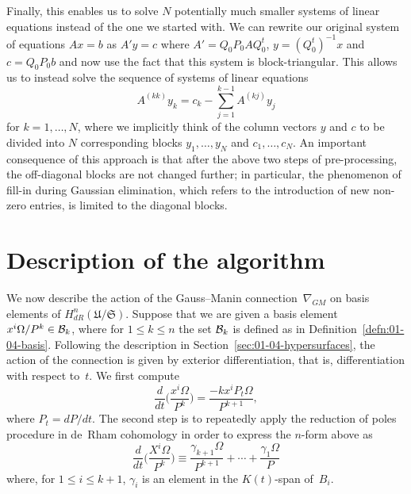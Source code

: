 Finally, this enables us to solve $N$ potentially much smaller systems of 
linear equations instead of the one we started with.  We can rewrite our 
original system of equations $Ax = b$ as $A' y = c$ where 
$A' = Q_0 P_0 A Q_0^t$, $y = (Q_0^t)^{-1} x$ and $c = Q_0 P_0 b$ and now use 
the fact that this system is block-triangular.  This allows us to instead 
solve the sequence of systems of linear equations 
\begin{equation}
A^{(kk)} y_k = c_k - \sum_{j=1}^{k-1} A^{(kj)} y_j
\end{equation}
for $k = 1, \dotsc, N$, where we implicitly think of the column vectors $y$ 
and $c$ to be divided into $N$ corresponding blocks $y_1, \dotsc, y_N$ and 
$c_1, \dotsc, c_N$.  An important consequence of this approach is that after 
the above two steps of pre-processing, the off-diagonal blocks are not changed 
further;  in particular, the phenomenon of fill-in during Gaussian 
elimination, which refers to the introduction of new non-zero entries, is 
limited to the diagonal blocks.


\section{Description of the algorithm}

We now describe the action of the Gauss--Manin connection~$\nabla_{GM}$ on 
basis elements of $H_{dR}^n(\mathfrak{U}/\mathfrak{S})$.  Suppose that we are 
given a basis element $x^i \Omega / P^k \in \mathcal{B}_k$, where for 
$1 \leq k \leq n$ the set $\mathcal{B}_k$ is defined as in 
Definition~\ref{defn:01-04-basis}.  Following the description in 
Section~\ref{sec:01-04-hypersurfaces}, the action of the connection 
is given by exterior differentiation, that is, differentiation with respect 
to~$t$.  We first compute 
\begin{equation*}
\frac{d}{dt} \biggl(\frac{x^i \Omega}{P^k}\biggr) = \frac{-k x^i P_t \Omega}{P^{k+1}},
\end{equation*}
where $P_t = dP/dt$.  The second step is to repeatedly apply the reduction of 
poles procedure in de~Rham cohomology in order to express the $n$-form above 
as 
\begin{equation*}
\frac{d}{dt} \biggl(\frac{X^i \Omega}{P^k}\biggr) \equiv 
    \frac{\gamma_{k+1} \Omega}{P^{k+1}} + \dotsb + \frac{\gamma_1 \Omega}{P}
\end{equation*}
where, for $1 \leq i \leq k+1$, $\gamma_i$ is an element in the $K(t)$-span 
of~$B_i$.

